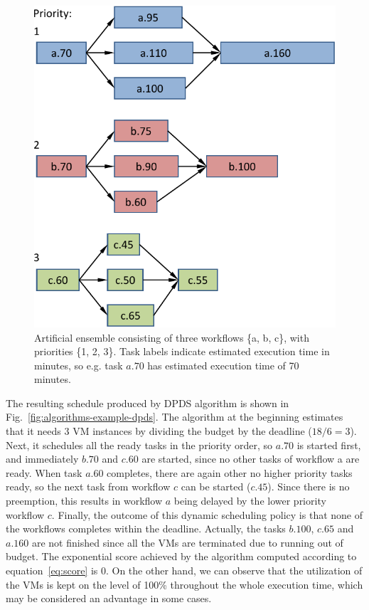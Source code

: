 \documentclass[preprint,5p]{elsarticle}
\begin{document}
\begin{figure}[htb] 
  \centering
  \includegraphics[width=0.80\columnwidth]{figures/example-ensemble}
  \caption{Artificial ensemble consisting of three workflows \{a, b, c\}, with priorities \{1, 2, 3\}.
  Task labels indicate estimated execution time in minutes, 
  so e.g. task $a.70$ has estimated execution time of 70 minutes.}
  \label{fig:example-ensemble}
\end{figure}

The resulting schedule produced by DPDS algorithm is shown in Fig.~\ref{fig:algorithms-example-dpds}.
The algorithm at the beginning estimates that it needs 3 VM instances by dividing the budget by the deadline ($18 / 6 = 3$). 
Next, it schedules all the ready tasks in the priority order, so $a.70$ is started first, 
and immediately $b.70$ and $c.60$ are started, since no other tasks of workflow a are ready. 
When task $a.60$ completes, there are again other no higher priority tasks ready, 
so the next task from workflow $c$ can be started ($c.45$). Since there is no preemption,
this results in workflow $a$ being delayed by the lower priority workflow $c$.
Finally, the outcome of this dynamic scheduling policy is that none of the workflows completes within the deadline.
Actually, the tasks $b.100$, $c.65$ and $a.160$ are not finished since all the VMs 
are terminated due to running out of budget. 
The exponential score achieved by the algorithm computed according to equation~\ref{eq:score} is 0.
On the other hand, we can observe that the utilization of the VMs is kept on the level of 100\% throughout the 
whole execution time, which may be considered an advantage in some cases.
\end{document}

